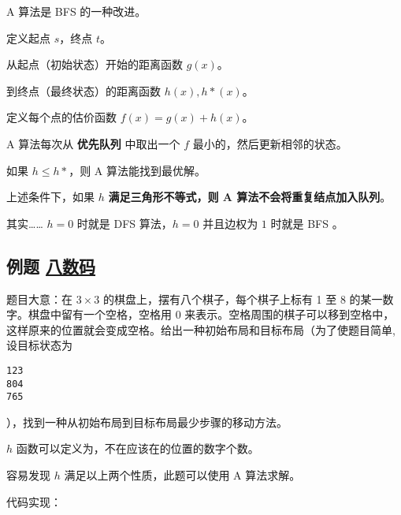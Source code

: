 
A 算法是  BFS  的一种改进。

定义起点 $s$，终点 $t$。

从起点（初始状态）开始的距离函数 $g(x)$。

到终点（最终状态）的距离函数 $h(x), h*(x)$。

定义每个点的估价函数 $f(x)=g(x)+h(x)$。

A 算法每次从 \textbf{优先队列} 中取出一个 $f$ 最小的，然后更新相邻的状态。

如果 $h\leq h*$，则 A 算法能找到最优解。

上述条件下，如果 $h$ \textbf{满足三角形不等式，则 A 算法不会将重复结点加入队列}。

其实…… $h=0$ 时就是  DFS  算法，$h=0$ 并且边权为 $1$ 时就是  BFS 。

\subsection{例题 \href{https://www.luogu.org/problemnew/show/P1379}{八数码}}

题目大意：在 $3\times 3$ 的棋盘上，摆有八个棋子，每个棋子上标有 1 至 8 的某一数字。棋盘中留有一个空格，空格用 0 来表示。空格周围的棋子可以移到空格中，这样原来的位置就会变成空格。给出一种初始布局和目标布局（为了使题目简单, 设目标状态为

\begin{verbatim}
123
804
765
\end{verbatim}

），找到一种从初始布局到目标布局最少步骤的移动方法。

$h$ 函数可以定义为，不在应该在的位置的数字个数。

容易发现 $h$ 满足以上两个性质，此题可以使用 A 算法求解。

代码实现：

